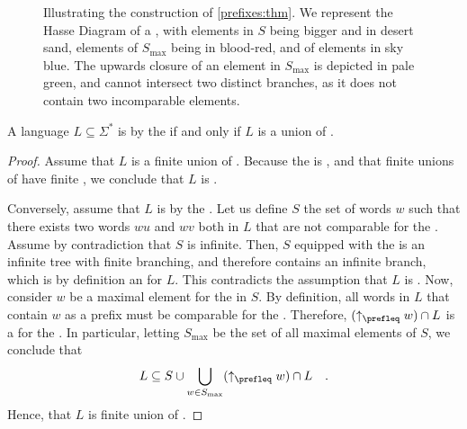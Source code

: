 \begin{figure}
    \centering
    
    \caption{Illustrating the construction of 
        \cref{prefixes:thm}. We represent the Hasse Diagram of a
        , with elements in $S$ being bigger and 
        in desert sand, elements of $S_{\max}$ being in
        blood-red, and  of elements in sky blue.
        The upwards closure of an element in $S_{\max}$ 
        is depicted in pale green, and cannot intersect two distinct
        branches, as it does not contain two incomparable elements.
    }
    \label{prefixes-theorem:fig}
\end{figure}

\begin{theorem}
    \label{prefixes:thm}
    A language $L \subseteq \Sigma^*$ is  by the
     if and only if $L$ is a union of .
\end{theorem}
\begin{proof}
    Assume that $L$ is a finite union of .
    Because the  is ,
    and that finite unions of  have finite ,
    we conclude that $L$ is .

    Conversely, assume that $L$ is  by the . Let us define $S$ the set of words $w$ such that there exists
    two words $wu$ and $wv$ both in $L$ that are not comparable for the
    . Assume by contradiction that $S$ is infinite.
    Then, $S$ equipped with the  is an infinite
    tree with finite branching, and therefore contains an infinite
    branch, which is by definition an  for $L$.
    This contradicts the assumption that $L$ is .
    Now, consider $w$ be a maximal element for the 
    in $S$. By definition, all words in $L$ that contain $w$ as a prefix
    must be comparable for the . Therefore,
    $(\upset[\prefleq]{w}) \cap L$ is a  for the .
    In particular, letting $S_{\max}$ be the set of all maximal elements
    of $S$,
    we conclude that 
    \begin{equation*}
        L \subseteq S \cup \bigcup_{w \in S_{\max}} (\upset[\prefleq]{w}) \cap L
        \quad .
    \end{equation*}
    Hence, that $L$ is finite union of .
\end{proof}

